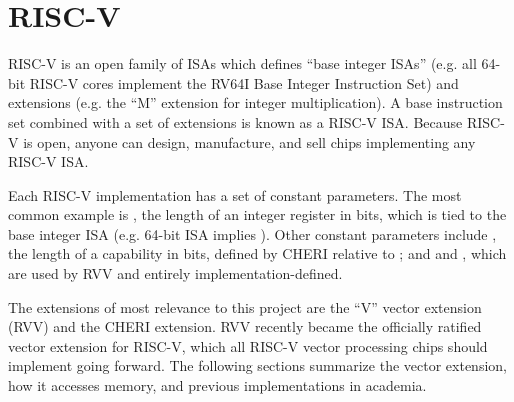 \section{RISC-V}\label{chap:bg:sec:riscv}
RISC-V is an open family of ISAs which defines ``base integer ISAs'' (e.g. all 64-bit RISC-V cores implement the RV64I Base Integer Instruction Set) and extensions (e.g. the ``M'' extension for integer multiplication).
A base instruction set combined with a set of extensions is known as a RISC-V ISA.
Because RISC-V is open, anyone can design, manufacture, and sell chips implementing any RISC-V ISA.

Each RISC-V implementation has a set of constant parameters.
The most common example is , the length of an integer register in bits, which is tied to the base integer ISA (e.g. 64-bit ISA implies ).
Other constant parameters include , the length of a capability in bits, defined by CHERI relative to ; and  and , which are used by RVV and entirely implementation-defined.

The extensions of most relevance to this project are the ``V'' vector extension (RVV) and the CHERI extension.
RVV recently became the officially ratified vector extension for RISC-V, which all RISC-V vector processing chips should implement going forward.
The following sections summarize the vector extension, how it accesses memory, and previous implementations in academia.

